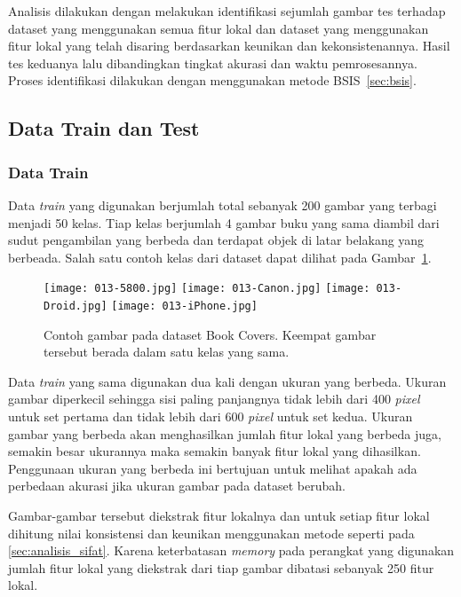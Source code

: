 Analisis dilakukan dengan melakukan identifikasi sejumlah gambar tes terhadap dataset yang menggunakan semua fitur lokal dan dataset yang menggunakan fitur lokal yang telah disaring berdasarkan keunikan dan kekonsistenannya. Hasil tes keduanya lalu dibandingkan tingkat akurasi dan waktu pemrosesannya. Proses identifikasi dilakukan dengan menggunakan metode BSIS~\ref{sec:bsis}.

\subsection{Data Train dan Test}
\subsubsection{Data Train}
Data \textit{train} yang digunakan berjumlah total sebanyak 200 gambar yang terbagi menjadi 50 kelas. Tiap kelas berjumlah 4 gambar buku yang sama diambil dari sudut pengambilan yang berbeda dan terdapat objek di latar belakang yang berbeada. Salah satu contoh kelas dari dataset dapat dilihat pada Gambar~\ref{fig:contoh_book_covers}.
\begin{figure}[H]
	\centering
	\texttt{[image: 013-5800.jpg]}
	\texttt{[image: 013-Canon.jpg]}
	\texttt{[image: 013-Droid.jpg]}
	\texttt{[image: 013-iPhone.jpg]}
	\caption{Contoh gambar pada dataset Book Covers. Keempat gambar tersebut berada dalam satu kelas yang sama.}
	\label{fig:contoh_book_covers}
\end{figure}

Data \textit{train} yang sama digunakan dua kali dengan ukuran yang berbeda. Ukuran gambar diperkecil sehingga sisi paling panjangnya tidak lebih dari 400 \textit{pixel} untuk set pertama dan tidak lebih dari 600 \textit{pixel} untuk set kedua. Ukuran gambar yang berbeda akan menghasilkan jumlah fitur lokal yang berbeda juga, semakin besar ukurannya maka semakin banyak fitur lokal yang dihasilkan. Penggunaan ukuran yang berbeda ini bertujuan untuk melihat apakah ada perbedaan akurasi jika ukuran gambar pada dataset berubah.

Gambar-gambar tersebut diekstrak fitur lokalnya dan untuk setiap fitur lokal dihitung nilai konsistensi dan keunikan menggunakan metode seperti pada \ref{sec:analisis_sifat}. Karena keterbatasan \textit{memory} pada perangkat yang digunakan jumlah fitur lokal yang diekstrak dari tiap gambar dibatasi sebanyak 250 fitur lokal.

